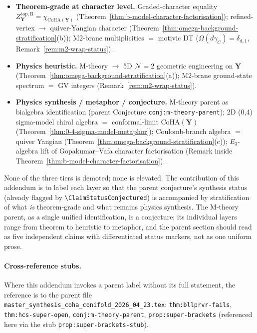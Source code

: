 \documentclass[11pt]{amsart}
\theoremstyle{definition}
\providecommand{\CoHA}{\mathrm{CoHA}}
\providecommand{\bY}{\mathbf{Y}}
\providecommand{\cN}{\mathcal{N}}
\begin{document}
\begin{itemize}[leftmargin=2em]
\item \textbf{Theorem-grade at character level.} Graded-character
  equality $Z^{\mathrm{top,B}}_{\bY} = \chi_{\CoHA(\bY)}$
  (Theorem~\ref{thm:b-model-character-factorisation});
  refined-vertex $\to$ quiver-Yangian character
  (Theorem~\ref{thm:omega-background-stratification}(b)); M2-brane
  multiplicities $= $ motivic DT
  ($\Omega(d\gamma_C) = \delta_{d,1}$, Remark~\ref{rem:m2-wrap-status}).
\item \textbf{Physics heuristic.} M-theory $\to$ 5D $\cN=2$
  geometric engineering on $\bY$
  (Theorem~\ref{thm:omega-background-stratification}(a)); M2-brane
  ground-state spectrum $=$ GV integers
  (Remark~\ref{rem:m2-wrap-status}).
\item \textbf{Physics synthesis / metaphor / conjecture.} M-theory
  parent as bialgebra identification (parent Conjecture
  \texttt{conj:m-theory-parent}); 2D (0,4) sigma-model chiral algebra
  $=$ conformal-limit $\CoHA(\bY)$
  (Theorem~\ref{thm:0-4-sigma-model-metaphor}); Coulomb-branch
  algebra $=$ quiver Yangian
  (Theorem~\ref{thm:omega-background-stratification}(c));
  $E_3$-algebra lift of Gopakumar--Vafa character factorisation
  (Remark inside
  Theorem~\ref{thm:b-model-character-factorisation}).
\end{itemize}

None of the three tiers is demoted; none is elevated. The
contribution of this addendum is to label each layer so that the
parent conjecture's synthesis status (already flagged by
\texttt{\textbackslash ClaimStatusConjectured}) is accompanied by
stratification of what \emph{is} theorem-grade and what remains
physics synthesis. The M-theory parent, as a single unified
identification, is a conjecture; its individual layers range from
theorem to heuristic to metaphor, and the parent section should read
as five independent claims with differentiated status markers, not as
one uniform prose.

\paragraph*{Cross-reference stubs.}
Where this addendum invokes a parent label without its full statement,
the reference is to the parent file
\texttt{master\_synthesis\_coha\_conifold\_2026\_04\_23.tex}:
\texttt{thm:bllprvr-fails},
\texttt{thm:hcs-super-open},
\texttt{conj:m-theory-parent},
\texttt{prop:super-brackets} (referenced here via the stub
\texttt{prop:super-brackets-stub}).
\end{document}
